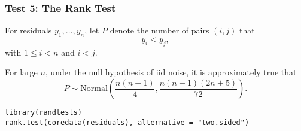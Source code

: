\documentclass{beamer}
\begin{document}

\begin{frame}[fragile]
\frametitle{Test 5: The Rank Test}

For residuals $y_1, \ldots, y_n$, let $P$ denote the number of pairs $(i,j)$ that 
\[
y_i < y_{j},
\]
with $1 \le i < n$ and $i < j$.
\newline

For large $n$, under the null hypothesis of iid noise, it is approximately true that
\[
P \sim \text{Normal}\left( \frac{n(n-1)}{4}, \frac{n(n-1)(2n+5)}{72} \right).
\]

\begin{verbatim}
library(randtests)
rank.test(coredata(residuals), alternative = "two.sided")
\end{verbatim}
\end{frame}
\end{document}
